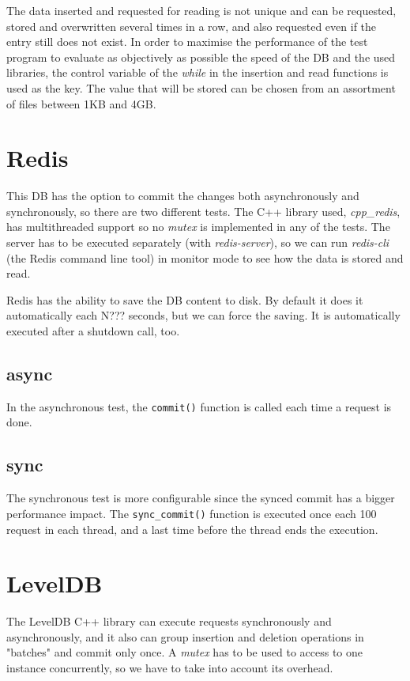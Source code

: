 \documentclass[11pt]{article}
\begin{document}
The data inserted and requested for reading is not unique and can be requested, stored and overwritten several times in a row, and also requested even if the entry still does not exist. In order to maximise the performance of the test program to evaluate as objectively as possible the speed of the DB and the used libraries, the control variable of the \textit{while} in the insertion and read functions is used as the key. The value that will be stored can be chosen from an assortment of files between 1KB and 4GB.


\section{Redis}
This DB has the option to commit the changes both asynchronously and synchronously, so there are two different tests. The C++ library used, \textit{cpp\_redis}, has multithreaded support so no \textit{mutex} is implemented in any of the tests. The server has to be executed separately (with \textit{redis-server}), so we can run \textit{redis-cli} (the Redis command line tool) in monitor mode to see how the data is stored and read.

Redis has the ability to save the DB content to disk. By default it does it automatically each N??? seconds, but we can force the saving. It is automatically executed after a shutdown call, too.

\subsection{async}
In the asynchronous test, the \texttt{commit()} function is called each time a request is done.

\subsection{sync}
The synchronous test is more configurable since the synced commit has a bigger performance impact. The \texttt{sync\_commit()} function is executed once each 100 request in each thread, and a last time before the thread ends the execution.

\section{LevelDB}
The LevelDB C++ library can execute requests synchronously and asynchronously, and it also can group insertion and deletion operations in "batches" and commit only once. A \textit{mutex} has to be used to access to one instance concurrently, so we have to take into account its overhead.
\end{document}
